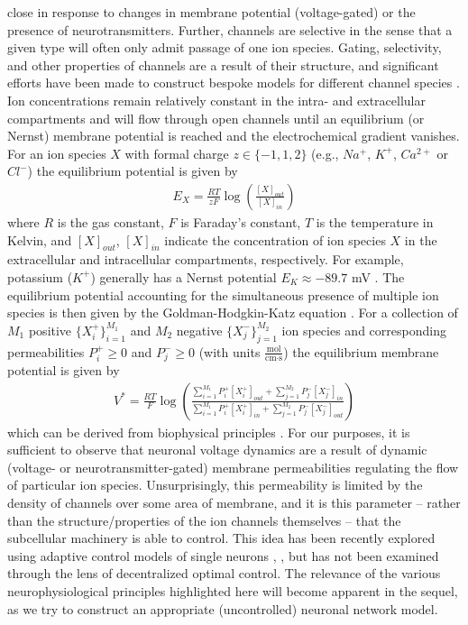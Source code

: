 \documentclass[12pt, oneside]{report}
\newcommand{\1}[1]{\mathbbm{1}_{\{#1\}}}
\theoremstyle{definition}
\begin{document}
close in response to changes in membrane potential (voltage-gated) or the
presence of neurotransmitters. Further, channels are selective in the sense that
a given type will often only admit passage of one ion species. Gating,
selectivity, and other properties of channels are a result of their structure,
and significant efforts have been made to construct bespoke models for different
channel species \cite[ch. 5,8]{Ermentrout_Terman_2010}. Ion concentrations remain
relatively constant in the intra- and extracellular compartments and will flow through open channels
until an equilibrium (or Nernst) membrane potential is reached and the
electrochemical gradient vanishes. For an ion species $X$ with formal charge
$z\in\{-1,1,2\}$ (e.g., $Na^+$, $K^+$, $Ca^{2+}$ or $Cl^-$) the equilibrium
potential is given by
\begin{align}
    E_X=\frac{RT}{zF}\log\left(\frac{[X]_{out}}{[X]_{in}}\right)
\end{align}
where $R$ is the gas constant, $F$ is Faraday's constant, $T$ is the temperature
in Kelvin, and $[X]_{out}$, $[X]_{in}$ indicate the concentration of ion species
$X$ in the extracellular and intracellular compartments, respectively. For
example, potassium ($K^+$) generally has a Nernst potential $E_K\approx -89.7$
mV \cite[$\S$ 2.5]{Johnston_Wu_1995}. The equilibrium potential accounting for
the simultaneous presence of multiple ion species is then given by the
Goldman-Hodgkin-Katz equation \cite[$\S$ 2.7.2]{Johnston_Wu_1995}. For a
collection of $M_1$ positive $\{X^+_i\}_{i=1}^{M_1}$ and $M_2$ negative
$\{X^-_j\}_{j=1}^{M_2}$ ion species and corresponding permeabilities $P^+_i\geq 0$ and
$P^-_j\geq 0$ (with units $\frac{\text{mol}}{\text{cm$\cdot$s}}$) the equilibrium
membrane potential is given by
\begin{align}
    V^\ast=\frac{RT}{F}\log\left(\frac{\sum_{i=1}^{M_1}P^+_i[X^+_i]_{out}+\sum_{j=1}^{M_2}P^-_j[X^-_j]_{in}}{\sum_{i=1}^{M_1}P^+_i[X^+_i]_{in}+\sum_{j=1}^{M_2}P^-_j[X^-_j]_{out}}\right)
\end{align}
which can be derived from biophysical principles \cite[$\S$
2.7]{Johnston_Wu_1995}. For our purposes, it is sufficient to observe that
neuronal voltage dynamics are a result of dynamic (voltage- or
neurotransmitter-gated) membrane permeabilities regulating the flow of
particular ion species. Unsurprisingly, this permeability is limited by the density of
channels over some area of membrane, and it is this parameter -- rather than the structure/properties of
the ion channels themselves -- that the subcellular machinery is able to control. This idea has been recently explored using
adaptive control models of single neurons \cite{Burghi_Sepulchre_2023}, \cite{Schmetterling_Burghi_Sepulchre_2022},
but has not been examined through the lens of decentralized optimal control. The relevance of the various
neurophysiological principles highlighted here will become apparent in the sequel, as we try to construct
an appropriate (uncontrolled) neuronal network model.
\end{document}
